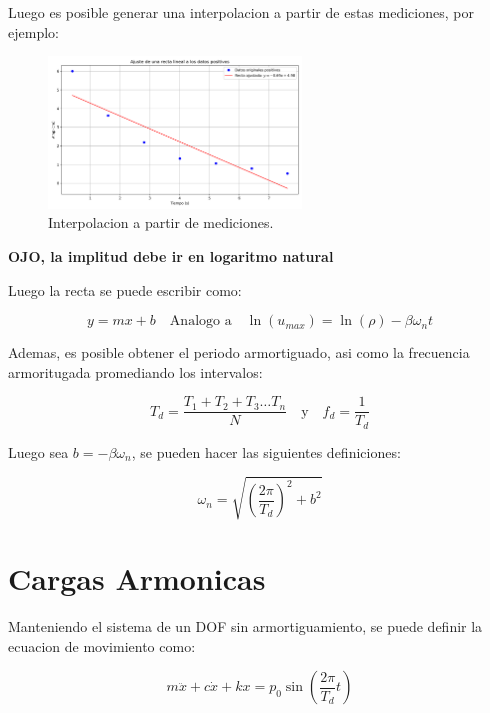 \documentclass{article}  %
\begin{document}
Luego es posible generar una interpolacion a partir de estas mediciones, por ejemplo:

\begin{figure}[H]
    \centering
    \includegraphics[width=0.6\textwidth]{GRAFICOS/ajuste_recta.png}
    \caption{Interpolacion a partir de mediciones.}
    \label{fig:ejemplo1}
\end{figure}

\textbf{OJO, la implitud debe ir en logaritmo natural}

Luego la recta se puede escribir como:

\begin{equation}
    y = mx + b \quad \text{Analogo a} \quad \ln(u_{max}) = \ln(\rho) - \beta \omega_n t
\end{equation}

Ademas, es posible obtener el periodo armortiguado, asi como la frecuencia armoritugada promediando los intervalos:

\begin{equation}
    T_d = \frac{T_1 + T_2 + T_3 \dots T_n}{N} \quad \text{y} \quad f_d = \frac{1}{T_d}
\end{equation}

Luego sea $b = -\beta \omega_n$, se pueden hacer las siguientes definiciones:

\begin{equation}
    \omega_n = \sqrt{(\frac{2 \pi}{T_d})^2 + b^2 } 
\end{equation}

\section{Cargas Armonicas}

Manteniendo el sistema de un DOF sin armortiguamiento, se puede definir la ecuacion de movimiento como:

\begin{equation}
    m \ddot{x} + c \dot{x} + kx = p_0 \sin(\frac{2\pi}{T_d}t)
\end{equation}
\end{document}
